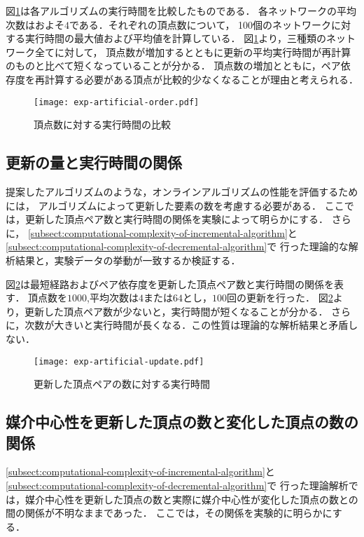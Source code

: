 図\ref{fig:exp-artificial-order}は各アルゴリズムの実行時間を比較したものである．
各ネットワークの平均次数はおよそ$4$である．それぞれの頂点数について，
100個のネットワークに対する実行時間の最大値および平均値を計算している．
図\ref{fig:exp-artificial-order}より，三種類のネットワーク全てに対して，
頂点数が増加するとともに更新の平均実行時間が再計算のものと比べて短くなっていることが分かる．
頂点数の増加とともに，ペア依存度を再計算する必要がある頂点が比較的少なくなることが理由と考えられる．

\begin{figure}[tb]
  \centering
  \texttt{[image: exp-artificial-order.pdf]}
  \caption{頂点数に対する実行時間の比較}
  \label{fig:exp-artificial-order}
\end{figure}

\subsection{更新の量と実行時間の関係}

提案したアルゴリズムのような，オンラインアルゴリズムの性能を評価するためには，
アルゴリズムによって更新した要素の数を考慮する必要がある．
\cite{Ramalingam1996,Lee2012,Pontecorvi2014}
ここでは，更新した頂点ペア数と実行時間の関係を実験によって明らかにする．
さらに，
\ref{subsect:computational-complexity-of-incremental-algorithm}と
\ref{subsect:computational-complexity-of-decremental-algorithm}で
行った理論的な解析結果と，実験データの挙動が一致するか検証する．

図\ref{fig:exp-artificial-update}は最短経路およびペア依存度を更新した頂点ペア数と実行時間の関係を表す．
頂点数を$1000$,平均次数は$4$または$64$とし，$100$回の更新を行った．
図\ref{fig:exp-artificial-update}より，更新した頂点ペア数が少ないと，実行時間が短くなることが分かる．
さらに，次数が大きいと実行時間が長くなる．この性質は理論的な解析結果と矛盾しない．

\begin{figure}[tb]
  \centering
  \texttt{[image: exp-artificial-update.pdf]}
  \caption{更新した頂点ペアの数に対する実行時間}
  \label{fig:exp-artificial-update}
\end{figure}

\subsection{媒介中心性を更新した頂点の数と変化した頂点の数の関係}

\ref{subsect:computational-complexity-of-incremental-algorithm}と
\ref{subsect:computational-complexity-of-decremental-algorithm}で
行った理論解析では，媒介中心性を更新した頂点の数と実際に媒介中心性が変化した頂点の数との
間の関係が不明なままであった．
ここでは，その関係を実験的に明らかにする．

